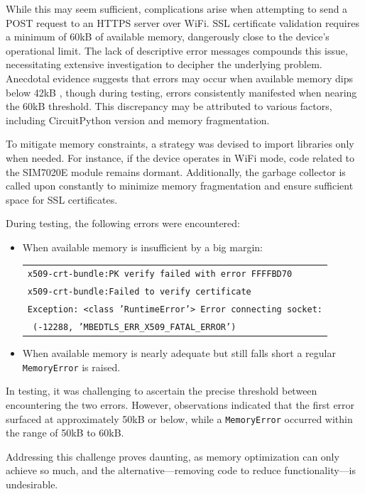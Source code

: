 While this may seem sufficient, complications arise when attempting to send a POST request to an 
HTTPS server over WiFi. SSL certificate validation requires a minimum of 60kB of available memory, 
dangerously close to the device's operational limit. The lack of descriptive error messages 
compounds this issue, necessitating extensive investigation to decipher the underlying problem. 
Anecdotal evidence suggests that errors may occur when available memory dips below 42kB 
\cite{ssl_memoryerror}, though during testing, errors consistently manifested when nearing the 60kB 
threshold. This discrepancy may be attributed to various factors, including CircuitPython version 
and memory fragmentation.

To mitigate memory constraints, a strategy was devised to import libraries only when needed. For 
instance, if the device operates in WiFi mode, code related to the SIM7020E module remains dormant. 
Additionally, the garbage collector is called upon constantly to minimize memory fragmentation and 
ensure sufficient space for SSL certificates.

During testing, the following errors were encountered:

\begin{itemize}
	\item When available memory is insufficient by a big margin:
	
	\begin{tabular}{l}
		\texttt{x509-crt-bundle:PK verify failed with error FFFFBD70} \\
		\texttt{x509-crt-bundle:Failed to verify certificate} \\
		\texttt{Exception: <class 'RuntimeError'> Error connecting socket:} \\
		\texttt{ (-12288, 'MBEDTLS\_ERR\_X509\_FATAL\_ERROR')}
	\end{tabular}

	\item When available memory is nearly adequate but still falls short a regular\\ 
	\texttt{MemoryError} is raised.
\end{itemize}

In testing, it was challenging to ascertain the precise threshold between encountering the two 
errors. However, observations indicated that the first error surfaced at approximately 50kB or 
below, while a \texttt{MemoryError} occurred within the range of 50kB to 60kB.

Addressing this challenge proves daunting, as memory optimization can only achieve so much, and the 
alternative—removing code to reduce functionality—is undesirable.

